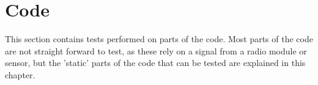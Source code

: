 \section{Code}
This section contains tests performed on parts of the code. Most parts of the code are not straight forward to test, as these rely on a signal from a radio module or sensor, but the 'static' parts of the code that can be tested are explained in this chapter.

 